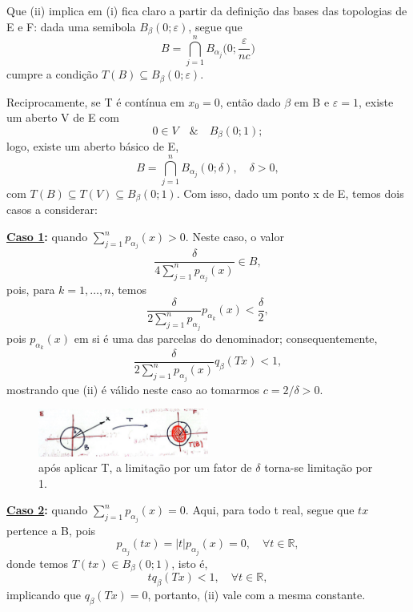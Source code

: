 \documentclass[../distribution_theory_notes.tex]{subfiles}
\begin{document}
\begin{proof*}
	Que (ii) implica em (i) fica claro a partir da definição das bases das topologias de E e F: dada uma semibola \(B_{\beta }(0; \varepsilon )\), segue que
	\[
		B=\bigcap_{j=1}^{n}B_{\alpha_{j}}\biggl(0; \frac{\varepsilon }{nc}\biggr)
	\]
	cumpre a condição \(T(B)\subseteq B_{\beta }(0; \varepsilon )\).

	Reciprocamente, se T é contínua em \(x_{0}=0\), então dado \(\beta \) em B e \(\varepsilon =1\), existe um aberto V de E com
	\[
		0\in V \quad\&\quad B_{\beta }(0; 1);
	\]
	logo, existe um aberto básico de E,
	\[
		B=\bigcap_{j=1}^{n}B_{\alpha_{j}}(0; \delta ),\quad \delta >0,
	\]
	com \(T(B)\subseteq T(V)\subseteq B_{\beta }(0;1).\) Com isso, dado um ponto x de E, temos dois casos a considerar:

	\textbf{\underline{Caso 1}:} quando \(\sum\limits_{j=1}^{n}p_{\alpha_{j}}(x)>0\). Neste caso, o valor
	\[
		\frac{\delta }{4 \sum\limits_{j=1}^{n}p_{\alpha_{j}}(x)}\in B,
	\]
	pois, para \(k=1,\dotsc ,n\), temos
	\[
		\frac{\delta }{2\sum\limits_{j=1}^{n}p_{\alpha_{j}}} p_{\alpha_{k}}(x)<\frac{\delta }{2},
	\]
	pois \(p_{\alpha_{k}}(x)\) em si é uma das parcelas do denominador; consequentemente,
	\[
		\frac{\delta }{2\sum\limits_{j=1}^{n}p_{\alpha_{j}}(x)} q_{\beta}(Tx)<1,
	\]
	mostrando que (ii) é válido neste caso ao tomarmos \(c=2/\delta >0.\)
	\begin{figure}[H]
		\begin{center}
			\includegraphics[height=0.5\textheight, width=0.5\textwidth, keepaspectratio]{./Images/application_05.png}
		\end{center}
		\caption{após aplicar T, a limitação por um fator de \(\delta \) torna-se limitação por 1.}
	\end{figure}

	\textbf{\underline{Caso 2}:} quando \(\sum\limits_{j=1}^{n}p_{\alpha_{j}}(x)=0.\) Aqui, para todo t real, segue que \(tx\) pertence a B, pois
	\[
		p_{\alpha_{j}}(tx)=|t|p_{\alpha_{j}}(x)=0, \quad \forall t\in \mathbb{R},
	\]
	donde temos \(T(tx)\in B_{\beta }(0; 1)\), isto é,
	\[
		tq_{\beta }(Tx)<1,\quad \forall t\in \mathbb{R},
	\]
	implicando que \(q_{\beta }(Tx)=0\), portanto, (ii) vale com a mesma constante. \qedsymbol
\end{proof*}
\end{document}
